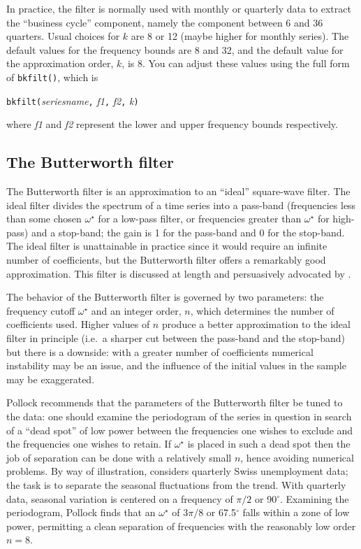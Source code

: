 In practice, the filter is normally used with monthly or quarterly
data to extract the ``business cycle'' component, namely the component
between 6 and 36 quarters. Usual choices for $k$ are 8 or 12 (maybe
higher for monthly series).  The default values for the frequency
bounds are 8 and 32, and the default value for the approximation
order, $k$, is 8. You can adjust these values using the full form
of \verb+bkfilt()+, which is

\texttt{bkfilt(}\textsl{seriesname}\texttt{,} \textsl{f1}\texttt{,} 
 \textsl{f2}\texttt{,} \textsl{k}\texttt{)}

where \textsl{f1} and \textsl{f2} represent the lower and upper
frequency bounds respectively.

\subsection{The Butterworth filter}
\label{sec:butterworth}

The Butterworth filter is an approximation to an ``ideal'' square-wave
filter. The ideal filter divides the spectrum of a time series into a
pass-band (frequencies less than some chosen $\omega^{\star}$ for a
low-pass filter, or frequencies greater than $\omega^{\star}$ for
high-pass) and a stop-band; the gain is 1 for the pass-band and 0 for
the stop-band. The ideal filter is unattainable in practice since it
would require an infinite number of coefficients, but the Butterworth
filter offers a remarkably good approximation. This filter is
discussed at length and persuasively advocated by \cite{pollock97}.

The behavior of the Butterworth filter is governed by two parameters:
the frequency cutoff $\omega^{\star}$ and an integer order, $n$, which
determines the number of coefficients used. Higher values of $n$
produce a better approximation to the ideal filter in principle (i.e.\
a sharper cut between the pass-band and the stop-band) but there is a
downside: with a greater number of coefficients numerical instability
may be an issue, and the influence of the initial values in the sample
may be exaggerated.

Pollock recommends that the parameters of the Butterworth filter be
tuned to the data: one should examine the periodogram of the series in
question in search of a ``dead spot'' of low power between the
frequencies one wishes to exclude and the frequencies one wishes to
retain. If $\omega^{\star}$ is placed in such a dead spot then the job
of separation can be done with a relatively small $n$, hence avoiding
numerical problems. By way of illustration, \cite{pollock97} considers
quarterly Swiss unemployment data; the task is to separate the
seasonal fluctuations from the trend. With quarterly data, seasonal
variation is centered on a frequency of $\pi/2$ or
90$^{\circ}$. Examining the periodogram, Pollock finds that an
$\omega^{\star}$ of $3\pi/8$ or 67.5$^{\circ}$ falls within a zone of
low power, permitting a clean separation of frequencies with the
reasonably low order $n=8$.

